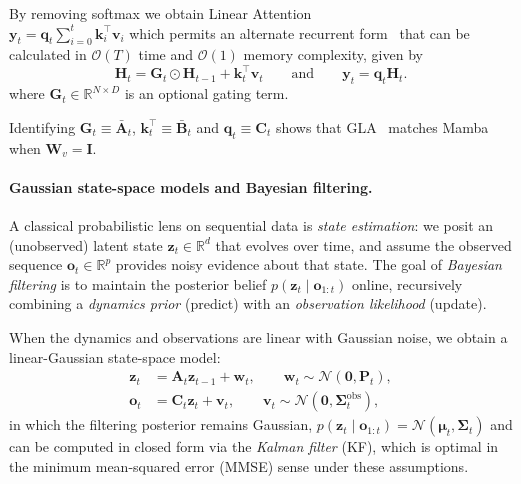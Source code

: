 \documentclass{article}
\begin{document}
By removing softmax we obtain Linear Attention
\\
$ \mathbf{y}_t = \mathbf{q}_t \sum_{i=0}^t  \mathbf{k}_i^\top \mathbf{v}_i$
which permits an alternate recurrent form~\cite{katharopoulos2020transformers} that can be calculated in $\mathcal{O}(T)$ time and $\mathcal{O}(1)$ memory complexity, given by
\begin{equation}
\mathbf{H}_t=\mathbf{G}_t\odot\mathbf{H}_{t-1}+\mathbf{k}_t^\top\mathbf{v}_t
\qquad\text{and}\qquad
\mathbf{y}_t=\mathbf{q}_t\mathbf{H}_t.
\label{eq:gla-rec}
\end{equation}
where $\mathbf{G}_t \in \mathbb{R}^{N \times D}$ is an optional gating term.

Identifying $\mathbf{G}_t \equiv \mathbf{\bar A}_t$, $\mathbf{k}_t^\top \equiv \mathbf{\bar B}_t$ and $\mathbf{q}_t \equiv \mathbf{C}_t$ 
shows that GLA~\citep{yang2023gated} matches Mamba when $\mathbf{W}_v = \mathbf{I}$.

\paragraph{Gaussian state-space models and Bayesian filtering.}
\label{par:ssm}
A classical probabilistic lens on sequential data is \emph{state estimation}: we posit an (unobserved) latent state
$\mathbf{z}_t \in \mathbb{R}^d$ that evolves over time, and assume the observed sequence
$\mathbf{o}_t \in \mathbb{R}^p$ provides noisy evidence about that state.
The goal of \emph{Bayesian filtering} is to maintain the posterior belief
$p(\mathbf{z}_t \mid \mathbf{o}_{1:t})$ online, recursively combining a \emph{dynamics prior}
(predict) with an \emph{observation likelihood} (update). 

When the dynamics and observations are linear with Gaussian noise, we obtain a linear-Gaussian state-space model:
\begin{align}
\mathbf{z}_t &= \mathbf{A}_t \mathbf{z}_{t-1} + \mathbf{w}_t,
\qquad \mathbf{w}_t \sim \mathcal{N}(\mathbf{0}, \mathbf{P}_t), \label{eq:lgssm_dyn}\\
\mathbf{o}_t &= \mathbf{C}_t \mathbf{z}_t + \mathbf{v}_t,
\qquad \mathbf{v}_t \sim \mathcal{N}(\mathbf{0}, \bm\Sigma^{\mathrm{obs}}_t), \label{eq:lgssm_obs}
\end{align}
in which the filtering posterior remains Gaussian, $
p(\mathbf{z}_t \mid \mathbf{o}_{1:t}) = \mathcal{N}(\bm\mu_t, \bm\Sigma_t)$
and can be computed in closed form via the \emph{Kalman filter} (KF), which is optimal in the minimum mean-squared error (MMSE) sense under these assumptions.
\end{document}
